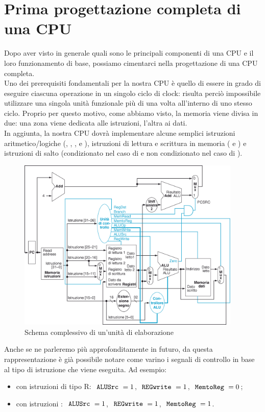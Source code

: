 \documentclass[class=book, crop=false, oneside]{standalone}
\begin{document}
\section{Prima progettazione completa di una CPU}
Dopo aver visto in generale quali sono le principali componenti di una CPU e il loro funzionamento di base, possiamo cimentarci nella progettazione di una CPU completa.\\
Uno dei prerequisiti fondamentali per la nostra CPU è quello di essere in grado di eseguire ciascuna operazione in un singolo ciclo di clock: risulta perciò impossibile utilizzare una singola unità funzionale più di una volta all'interno di uno stesso ciclo. Proprio per questo motivo, come abbiamo visto, la memoria viene divisa in due: una zona viene dedicata alle istruzioni, l'altra ai dati.\\
In aggiunta, la nostra CPU dovrà implementare alcune semplici istruzioni aritmetico/logiche (, , ,  e ), istruzioni di lettura e scrittura in memoria ( e ) e istruzioni di salto (condizionato nel caso di  e non condizionato nel caso di ).

\begin{figure}[H]
	\centering
	\includegraphics[width=0.95\textwidth,keepaspectratio]{schema_complessivo.png}
	\caption{Schema complessivo di un'unità di elaborazione}
\end{figure}
Anche se ne parleremo più approfonditamente in futuro, da questa rappresentazione è già possibile notare come varino i segnali di controllo in base al tipo di istruzione che viene eseguita. Ad esempio:
\begin{itemize}
	\item con istruzioni di tipo R: \(\textrm{ \texttt{ALUSrc} }=1\), \(\textrm{ \texttt{REGwrite} }= 1\), \(\textrm{ \texttt{MemtoReg} }=0\);
	\item con istruzioni : \(\textrm{ \texttt{ALUSrc} }=1\), \(\textrm{ \texttt{REGwrite} }= 1\), \(\textrm{ \texttt{MemtoReg} }=1\).
\end{itemize}
\end{document}
